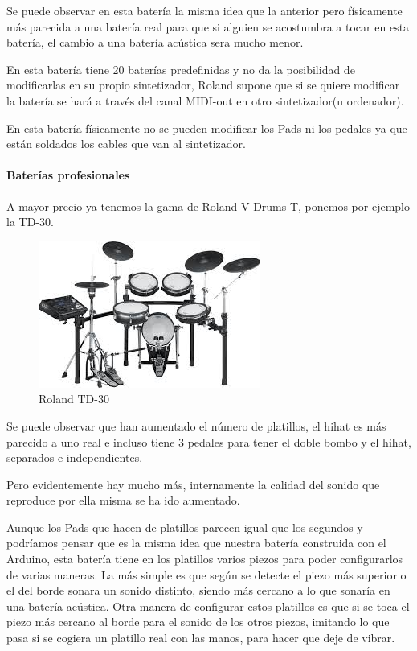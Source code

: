 \documentclass[a4paper,11pt,oneside]{book}
\begin{document}
Se puede observar en esta batería la misma idea que la anterior pero físicamente más parecida a una batería real para que si alguien se acostumbra a tocar en esta batería, el cambio a una batería acústica sera mucho menor.

En esta batería tiene 20 baterías predefinidas y no da la posibilidad de modificarlas en su propio sintetizador, Roland supone que si se quiere modificar la batería se hará a través del canal MIDI-out en otro sintetizador(u ordenador).

En esta batería físicamente no se pueden modificar los \gls{Pads} ni los pedales ya que están soldados los cables que van al sintetizador.


\paragraph{Baterías profesionales}

 A mayor precio ya tenemos la gama de Roland V-Drums T, ponemos por ejemplo la TD-30.
 
\begin{figure}[H]
\begin{center}
\includegraphics[scale=0.7]{Imagenes/td-30.jpg}
\caption{Roland TD-30}
\label{Roland TD-30}
\end{center}
\end{figure}

Se puede observar que han aumentado el número de platillos, el hihat es más parecido a uno real e incluso tiene 3 pedales para tener el doble bombo y el hihat, separados e independientes.

Pero evidentemente hay mucho más, internamente la calidad del sonido que reproduce por ella misma se ha ido aumentado.

Aunque los \gls{Pads} que hacen de platillos parecen igual que los segundos y podríamos pensar que es la misma idea que nuestra batería construida con el Arduino, esta batería tiene en los platillos varios piezos para poder configurarlos de varias maneras.
La más simple es que según se detecte el piezo más superior o el del borde sonara un sonido distinto, siendo más cercano a lo que sonaría en una batería acústica.
Otra manera de configurar estos platillos es que si se toca el piezo más cercano al borde para el sonido de los otros piezos, imitando lo que pasa si se cogiera un platillo real con las manos, para hacer que deje de vibrar.
\end{document}
